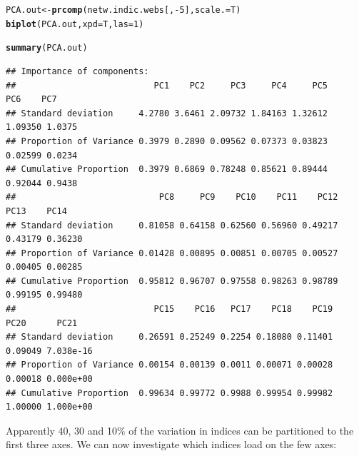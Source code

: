 \documentclass[a4paper, 11pt]{article}\usepackage[]{graphicx}\usepackage[dvipsnames]{xcolor}
\makeatletter
\newcommand{\hlnum}[1]{\textcolor[rgb]{0.686,0.059,0.569}{#1}}%
\newcommand{\hlopt}[1]{\textcolor[rgb]{0,0,0}{#1}}%
\newcommand{\hlstd}[1]{\textcolor[rgb]{0.345,0.345,0.345}{#1}}%
\newcommand{\hlkwb}[1]{\textcolor[rgb]{0.69,0.353,0.396}{#1}}%
\newcommand{\hlkwc}[1]{\textcolor[rgb]{0.333,0.667,0.333}{#1}}%
\newcommand{\hlkwd}[1]{\textcolor[rgb]{0.737,0.353,0.396}{\textbf{#1}}}%
\newenvironment{kframe}{%
 \def\at@end@of@kframe{}%
 \ifinner\ifhmode%
  \def\at@end@of@kframe{\end{minipage}}%
  \begin{minipage}{\columnwidth}%
 \fi\fi%
 \def\FrameCommand##1{\hskip\@totalleftmargin \hskip-\fboxsep
 \colorbox{shadecolor}{##1}\hskip-\fboxsep
     \hskip-\linewidth \hskip-\@totalleftmargin \hskip\columnwidth}%
 \MakeFramed {\advance\hsize-\width
   \@totalleftmargin\z@ \linewidth\hsize
   \@setminipage}}%
 {\par\unskip\endMakeFramed%
 \at@end@of@kframe}
\newenvironment{knitrout}{}{} %
\makeatother
\begin{document}
\begin{knitrout}
\color{fgcolor}\begin{kframe}
\begin{alltt}
\hlstd{PCA.out} \hlkwb{<-} \hlkwd{prcomp}\hlstd{(netw.indic.webs[,}\hlopt{-}\hlnum{5}\hlstd{],} \hlkwc{scale.}\hlstd{=T)}
\hlkwd{biplot}\hlstd{(PCA.out,} \hlkwc{xpd}\hlstd{=T,} \hlkwc{las}\hlstd{=}\hlnum{1}\hlstd{)}
\end{alltt}
\end{kframe}
\end{knitrout}
\begin{knitrout}
\color{fgcolor}\begin{kframe}
\begin{alltt}
\hlkwd{summary}\hlstd{(PCA.out)}
\end{alltt}
\begin{verbatim}
## Importance of components:
##                           PC1    PC2     PC3     PC4     PC5     PC6    PC7
## Standard deviation     4.2780 3.6461 2.09732 1.84163 1.32612 1.09350 1.0375
## Proportion of Variance 0.3979 0.2890 0.09562 0.07373 0.03823 0.02599 0.0234
## Cumulative Proportion  0.3979 0.6869 0.78248 0.85621 0.89444 0.92044 0.9438
##                            PC8     PC9    PC10    PC11    PC12    PC13    PC14
## Standard deviation     0.81058 0.64158 0.62560 0.56960 0.49217 0.43179 0.36230
## Proportion of Variance 0.01428 0.00895 0.00851 0.00705 0.00527 0.00405 0.00285
## Cumulative Proportion  0.95812 0.96707 0.97558 0.98263 0.98789 0.99195 0.99480
##                           PC15    PC16   PC17    PC18    PC19    PC20      PC21
## Standard deviation     0.26591 0.25249 0.2254 0.18080 0.11401 0.09049 7.038e-16
## Proportion of Variance 0.00154 0.00139 0.0011 0.00071 0.00028 0.00018 0.000e+00
## Cumulative Proportion  0.99634 0.99772 0.9988 0.99954 0.99982 1.00000 1.000e+00
\end{verbatim}
\end{kframe}
\end{knitrout}

Apparently 40, 30 and 10\% of the variation in indices can be partitioned to the first three axes. We can now investigate which indices load on the few axes:
\end{document}
